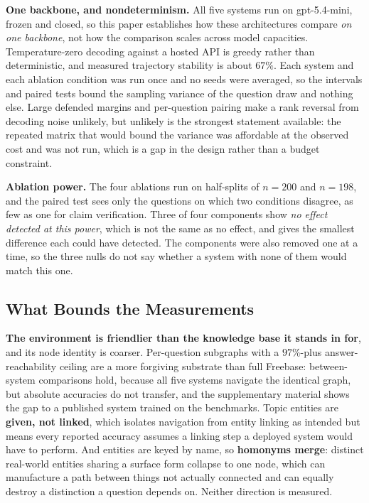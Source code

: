 \textbf{One backbone, and nondeterminism.} All five systems run on
\textsf{gpt-5.4-mini}, frozen and closed, so this paper establishes how
these architectures compare \emph{on one backbone}, not how the
comparison scales across model capacities. Temperature-zero decoding
against a hosted API is greedy rather than deterministic, and measured
trajectory stability is about $67\%$. Each system and each ablation
condition was run once and no seeds were averaged, so the intervals and
paired tests bound the sampling variance of the question draw and
nothing else. Large defended margins and per-question pairing make a
rank reversal from decoding noise unlikely, but unlikely is the
strongest statement available: the repeated matrix that would bound the
variance was affordable at the observed cost and was not run, which is a
gap in the design rather than a budget constraint.

\textbf{Ablation power.} The four ablations run on half-splits of $n =
200$ and $n = 198$, and the paired test sees only the questions on which
two conditions disagree, as few as one for claim verification. Three of
four components show \emph{no effect detected at this power}, which is
not the same as no effect, and  gives the smallest
difference each could have detected. The components were also removed
one at a time, so the three nulls do not say whether a system with none
of them would match this one.

\subsection{What Bounds the Measurements}\label{sec:limits-measurement}

\textbf{The environment is friendlier than the knowledge base it stands
in for}, and its node identity is coarser. Per-question subgraphs with a
$97\%$-plus answer-reachability ceiling are a more forgiving substrate
than full Freebase: between-system comparisons hold, because all five
systems navigate the identical graph, but absolute accuracies do not
transfer, and the supplementary material shows the gap to a published
system trained on the benchmarks. Topic entities are \textbf{given, not
linked}, which isolates navigation from entity linking as intended but
means every reported accuracy assumes a linking step a deployed system
would have to perform. And entities are keyed by name, so
\textbf{homonyms merge}: distinct real-world entities sharing a surface
form collapse to one node, which can manufacture a path between things
not actually connected and can equally destroy a distinction a question
depends on. Neither direction is measured.

